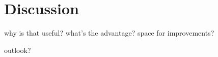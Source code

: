 

\section{Discussion}

why is that useful?
what's the advantage?
space for improvements?


outlook?

